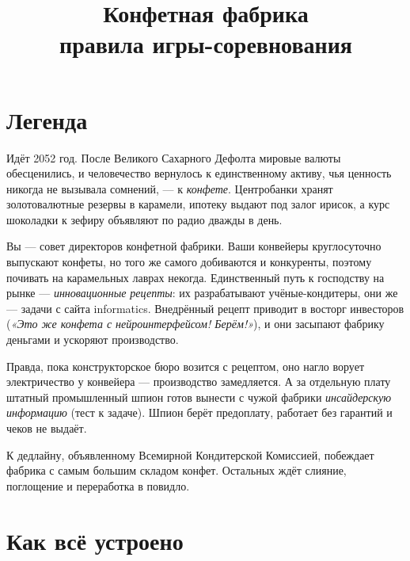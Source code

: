 \documentclass[12pt,a4paper]{article}
\title{\textbf{\textcolor{choco}{Конфетная фабрика}}\\[4pt]
\large правила игры-соревнования}
\date{}
\begin{document}
\maketitle
\vspace{-2.5em}

\section*{Легенда}

Идёт 2052 год. После Великого Сахарного Дефолта мировые валюты обесценились,
и человечество вернулось к единственному активу, чья ценность никогда не
вызывала сомнений, --- к \emph{конфете}. Центробанки хранят золотовалютные
резервы в карамели, ипотеку выдают под залог ирисок, а курс шоколадки
к зефиру объявляют по радио дважды в день.

Вы --- совет директоров конфетной фабрики. Ваши конвейеры круглосуточно
выпускают конфеты, но того же самого добиваются и конкуренты, поэтому
почивать на карамельных лаврах некогда. Единственный путь к господству
на рынке --- \emph{инновационные рецепты}: их разрабатывают учёные-кондитеры,
они же --- задачи с сайта informatics. Внедрённый рецепт приводит в восторг
инвесторов (\emph{«Это же конфета с нейроинтерфейсом! Берём!»}),
и они засыпают фабрику деньгами и ускоряют производство.

Правда, пока конструкторское бюро возится с рецептом, оно нагло ворует
электричество у конвейера --- производство замедляется. А за отдельную плату
штатный промышленный шпион готов вынести с чужой фабрики
\emph{инсайдерскую информацию} (тест к задаче). Шпион берёт предоплату,
работает без гарантий и чеков не выдаёт.

К дедлайну, объявленному Всемирной Кондитерской Комиссией, побеждает
фабрика с самым большим складом конфет. Остальных ждёт слияние,
поглощение и переработка в повидло.

\section*{Как всё устроено}
\end{document}
